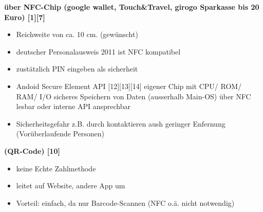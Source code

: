\textbf{ über NFC-Chip (google wallet, Touch\&Travel, girogo Sparkasse bis 20 Euro) [1][7]}\\
        \begin{itemize}
        \item Reichweite von ca. 10 cm. (gewünscht)
        \item deutscher Personalausweis 2011 ist NFC kompatibel
        \item zustätzlich PIN eingeben als sicherheit
        \item Andoid Secure Element API [12][13][14]
        \subitem  eigener Chip mit CPU/ ROM/ RAM/ I/O
        \subitem  sicheres Speichern von Daten (ausserhalb Main-OS)
        \subitem  über NFC lesbar oder interne API ansprechbar
        \item Sicherheitsgefahr z.B. durch kontaktieren aush geringer Enfernung (Vorüberlaufende Personen)
        \end{itemize}

\textbf{ (QR-Code) [10]}\\
        \begin{itemize}
        \item keine Echte Zahlmethode
        \item leitet auf Website, andere App um
        \item Vorteil: einfach, da nur Barcode-Scannen (NFC o.ä. nicht notwendig)
        \end{itemize}


